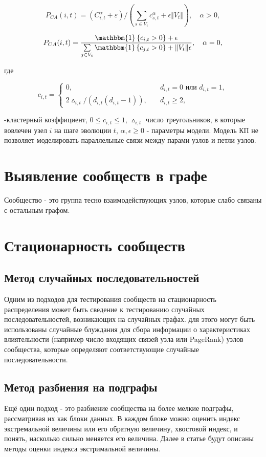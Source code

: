 \documentclass[a4paper,12pt]{article}
\begin{document}
\begin{equation}\label{F11}
P_{CA}(i,t) = (C_{i,t}^{\alpha} + \varepsilon) / (\sum\limits_{s \in V_{t}} c_{s,t}^{\alpha} + \epsilon \Vert V_{t} \Vert), \quad \alpha > 0,
\end{equation}

\begin{equation}\label{F12}
P_{CA}(i,t) = \dfrac{\mathbbm{1}\left\{c_{i,t}>0 \right\}+\epsilon}{\sum\limits_{j \in V_{t}} \mathbbm{1}\left\{c_{j,t}>0 \right\} + \Vert V_{t} \Vert\epsilon}, \quad \alpha = 0,
\end{equation}

где

\[ c_{i,t} =
  \begin{cases}
    0,       & \quad d_{i,t}=0 \text{ или } d_{i,t}=1,\\
    2 \vartriangle_{i,t} / (d_{i,t}(d_{i,t}-1)),  & \quad d_{i,t} \geq 2,
  \end{cases}
\]

-кластерный коэффициент, $0\leq c_{i,t} \leq1$, $\vartriangle_{i,t}$ число треугольников, в которые вовлечен узел $i$ на шаге эволюции $t$, $\alpha, \epsilon \geq 0$ - параметры модели. Модель КП не позволяет моделировать параллельные связи между парами узлов и петли узлов.

\section{Выявление сообществ в графе}
Сообщество - это группа тесно взаимодействующих узлов, которые слабо связаны с остальным графом.


\section{Стационарность сообществ}
\subsection{Метод случайных последовательностей}
	Одним из подходов для тестирования сообществ на стационарность распределения может быть сведение к тестированию случайных последовательностей, возникающих на случайных графах. для этого могут быть использованы случайные блуждания для сбора информации о характеристиках влиятельности (например число входящих связей узла или PageRank) узлов сообщества, которые определяют соответствующие случайные последовательности.
	



\subsection{Метод разбиения на подграфы}
	Ещё один подход - это разбиение сообщества на более мелкие подграфы, рассматривая их как блоки данных. В каждом блоке можно оценить индекс экстремальной величины или его обратную величину, хвостовой индекс, и понять, насколько сильно меняется его величина. Далее в статье будут описаны методы оценки индекса экстримальной величины.
\end{document}
